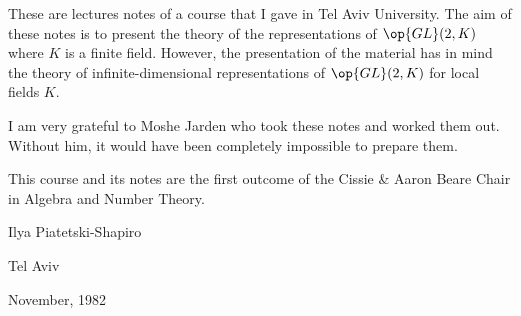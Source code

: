 \documentclass[../main.tex]{subfiles}
\begin{document}
These are lectures notes of a course that I gave in Tel Aviv University. The aim of these notes is to present the theory of the representations of $\op{GL}(2,K)$ where $K$ is a finite field. However, the presentation of the material has in mind the theory of infinite-dimensional representations of $\op{GL}(2,K)$ for local fields $K$.

I am very grateful to Moshe Jarden who took these notes and worked them out. Without him, it would have been completely impossible to prepare them.

This course and its notes are the first outcome of the Cissie \& Aaron Beare Chair in Algebra and Number Theory.

\vspace{1em}

\begin{flushright}
	Ilya Piatetski-Shapiro

	Tel Aviv

	November, 1982
\end{flushright}
\end{document}
